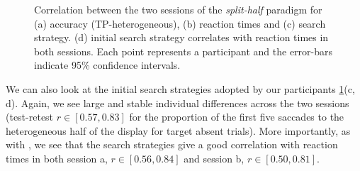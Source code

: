 \documentclass[]{rsos}%
\begin{document}
\begin{figure}
\centering
{}
\caption{Correlation between the two sessions of the \textit{split-half} paradigm for (a)  accuracy (TP-heterogeneous), (b) reaction times and (c) search strategy. (d) initial search strategy correlates with reaction times in both sessions. Each point represents a participant and the error-bars indicate 95\% confidence intervals.}
\label{fig:splithalf_summary}
\end{figure}

We can also look at the initial search strategies adopted by our participants \ref{fig:splithalf_summary}(c, d). Again, we see large and stable individual differences across the two sessions (test-retest $r \in [0.57, 0.83]$ for the proportion of the first five saccades to the heterogeneous half of the display for target absent trials). More importantly, as with \cite{nowakowsak2017}, we see that the search strategies give a good correlation with reaction times in both session a, $r \in [0.56, 0.84]$ and session b, $r \in [0.50, 0.81]$.
\end{document}
